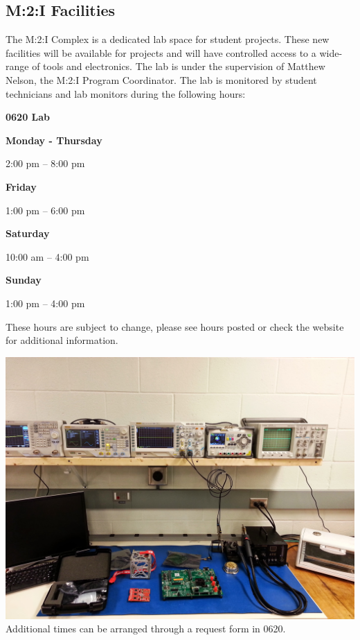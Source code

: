 \documentclass[10pt,foldmark,notumble]{leaflet}
\begin{document}
\subsection{M:2:I Facilities}
The M:2:I Complex is a dedicated lab space for student projects.  These new facilities will be available for projects and will have controlled access to a wide-range of tools and electronics.  The lab is under the supervision of Matthew Nelson, the M:2:I Program Coordinator.  The lab is monitored by student technicians and lab monitors during the following hours:

\begin{center}
\vspace{0.2cm}
{\large \bf 0620 Lab}

\vspace{0.2cm}
{\bf Monday - Thursday}

2:00 pm -- 8:00 pm

\vspace{0.2cm}
{\bf Friday}

1:00 pm -- 6:00 pm

\vspace{0.2cm}
{\bf Saturday}

10:00 am -- 4:00 pm

\vspace{0.2cm}
{\bf Sunday}

1:00 pm -- 4:00 pm

These hours are subject to change, please see hours posted or check the website for additional information.
\end{center}

\includegraphics[scale=.068]{images/0620elab.jpg}
Additional times can be arranged through a request form in 0620.
\end{document}
